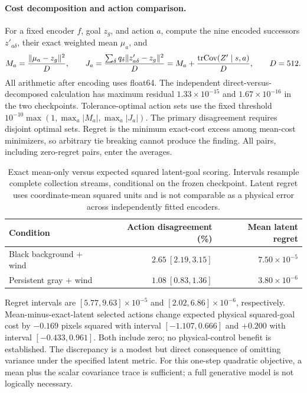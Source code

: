 \paragraph{Cost decomposition and action comparison.}
For a fixed encoder $f$, goal $z_g$, and action $a$, compute the nine encoded successors $z'_{a\delta}$,
their exact weighted mean $\mu_a$, and
\begin{equation}
\label{eq:oracle-variance}
M_a=\frac{\|\mu_a-z_g\|^2}{D},\qquad
J_a=\frac{\sum_\delta q_\delta\|z'_{a\delta}-z_g\|^2}{D}
=M_a+\frac{\mathrm{tr}\mathrm{Cov}(Z'\mid s,a)}{D},\qquad D=512.
\end{equation}
All arithmetic after encoding uses float64. The independent direct-versus-decomposed calculation
has maximum residual $1.33\times10^{-15}$ and $1.67\times10^{-16}$ in the two checkpoints.
Tolerance-optimal action sets use the fixed threshold
$10^{-10}\max(1,\max_a|M_a|,\max_a|J_a|)$.
The primary disagreement requires disjoint optimal sets. Regret is the minimum exact-cost excess
among mean-cost minimizers, so arbitrary tie breaking cannot produce the finding. All pairs,
including zero-regret pairs, enter the averages.

\begin{table}[ht]
\centering
\caption{Exact mean-only versus expected squared latent-goal scoring. Intervals resample complete
collection streams, conditional on the frozen checkpoint. Latent regret uses coordinate-mean squared
units and is not comparable as a physical error across independently fitted encoders.}
\label{tab:oracle-variance}
\begin{tabular}{lrr}
\toprule
Condition & Action disagreement (\%) & Mean latent regret \\
\midrule
Black background + wind & $2.65\ [2.19,3.15]$ & $7.50\times10^{-5}$ \\
Persistent gray + wind & $1.08\ [0.83,1.36]$ & $3.80\times10^{-6}$ \\
\bottomrule
\end{tabular}
\end{table}

Regret intervals are $[5.77,9.63]\times10^{-5}$ and $[2.02,6.86]\times10^{-6}$, respectively.
Mean-minus-exact-latent selected actions change expected physical squared-goal cost by
$-0.169$ pixels squared with interval $[-1.107,0.666]$ and $+0.200$ with interval
$[-0.433,0.961]$. Both include zero; no physical-control benefit is established. The discrepancy
is a modest but direct consequence of omitting variance under the specified latent metric.
For this one-step quadratic objective, a mean plus the scalar covariance trace is sufficient;
a full generative model is not logically necessary.

